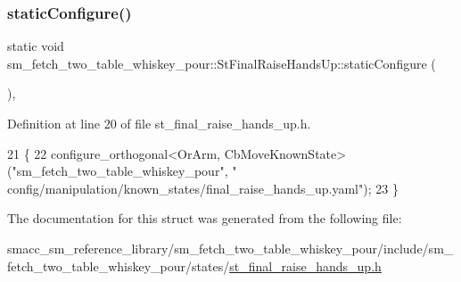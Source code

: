 \subsubsection{\texorpdfstring{static\+Configure()}{staticConfigure()}}
{\footnotesize\ttfamily static void sm\+\_\+fetch\+\_\+two\+\_\+table\+\_\+whiskey\+\_\+pour\+::\+St\+Final\+Raise\+Hands\+Up\+::static\+Configure (\begin{DoxyParamCaption}{ }\end{DoxyParamCaption})\hspace{0.3cm}{\ttfamily [inline]}, {\ttfamily [static]}}



Definition at line 20 of file st\+\_\+final\+\_\+raise\+\_\+hands\+\_\+up.\+h.


\begin{DoxyCode}
21     \{
22         configure\_orthogonal<OrArm, CbMoveKnownState>(\textcolor{stringliteral}{"sm\_fetch\_two\_table\_whiskey\_pour"}, \textcolor{stringliteral}{"
      config/manipulation/known\_states/final\_raise\_hands\_up.yaml"});
23     \}
\end{DoxyCode}


The documentation for this struct was generated from the following file\+:\begin{DoxyCompactItemize}
\item 
smacc\+\_\+sm\+\_\+reference\+\_\+library/sm\+\_\+fetch\+\_\+two\+\_\+table\+\_\+whiskey\+\_\+pour/include/sm\+\_\+fetch\+\_\+two\+\_\+table\+\_\+whiskey\+\_\+pour/states/\hyperlink{sm__fetch__two__table__whiskey__pour_2include_2sm__fetch__two__table__whiskey__pour_2states_2st__final__raise__hands__up_8h}{st\+\_\+final\+\_\+raise\+\_\+hands\+\_\+up.\+h}\end{DoxyCompactItemize}
